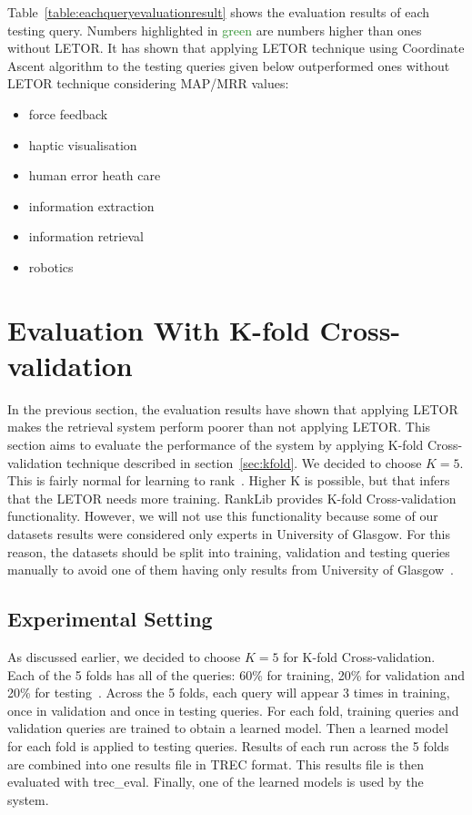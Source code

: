Table~\ref{table:eachqueryevaluationresult} shows the evaluation results of each testing query. Numbers highlighted in \textcolor{ForestGreen}{green}
are numbers higher than ones without LETOR. It has shown that applying LETOR technique using
Coordinate Ascent algorithm to the testing queries given below outperformed ones without LETOR technique considering MAP/MRR values:
\begin{itemize}
 \item force feedback
 \item haptic visualisation
 \item human error heath care
 \item information extraction
 \item information retrieval
 \item robotics
\end{itemize}

\section{Evaluation With K-fold Cross-validation}
In the previous section, the evaluation results have shown that applying LETOR makes the retrieval system perform poorer than not applying LETOR. 
This section aims to evaluate the performance of the system by applying K-fold Cross-validation
technique described in section~\ref{sec:kfold}. We decided to choose $K = 5$. This is fairly normal for learning to rank~\cite{craig}.
Higher K is possible, but that infers that the LETOR needs more training. RankLib provides K-fold Cross-validation functionality. However, we will not
use this functionality because some of our datasets results were considered only experts in University of Glasgow. For this reason, the datasets should
be split into training, validation and testing queries manually to avoid one of them having only results from University of Glasgow~\cite{craig}.


\subsection{Experimental Setting}

As discussed earlier, we decided to choose $K = 5$ for K-fold Cross-validation. Each of the 5 folds has all of the queries: 60\% for training, 
20\% for validation and 20\% for testing~\cite{kfoldcv}. Across the 5 folds, each query will appear 3 times in training, once in validation and 
once in testing queries. For each fold, training queries and validation queries are trained to obtain a learned model.
Then a learned model for each fold is applied to testing queries. Results of each run across the 5 folds are combined into one results file in
TREC format. This results file is then evaluated with trec\_eval. Finally, one of the learned models is used by the system.

